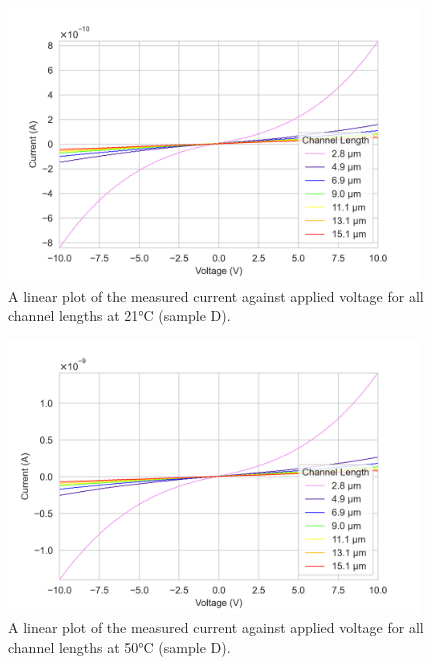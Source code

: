 \label{app:I_V_sample_D_10V}
\begin{figure}[h]
    \centering
    \includegraphics[width=0.97\textwidth]{Chapter6/Figs/Raster/Sample D 2019/IV/10V IV characteristics at 21 C.png}
    \caption{A linear plot of the measured current against applied voltage for all channel lengths at 21\si{\degreeCelsius} (sample D).}
    \label{appfig:D_current_voltage_21_10V}
\end{figure}
\begin{figure}[h]
    \centering
    \includegraphics[width=0.97\textwidth]{Chapter6/Figs/Raster/Sample D 2019/IV/10V IV characteristics at 50 C.png}
    \caption{A linear plot of the measured current against applied voltage for all channel lengths at 50\si{\degreeCelsius} (sample D).}
    \label{appfig:D_current_voltage_50_10V}
\end{figure}
